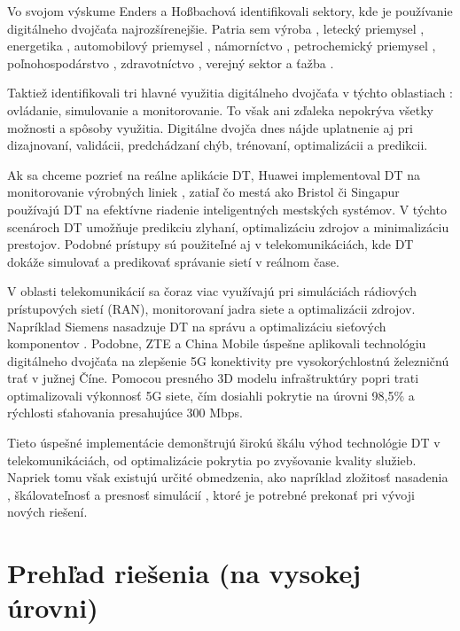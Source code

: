 \par{Vo  svojom výskume Enders a Hoßbachová \cite{DimensionOfDTAplication} identifikovali sektory, kde je používanie digitálneho dvojčaťa najrozšírenejšie. Patria sem výroba \cite{manuf}, letecký priemysel \cite{aircraft}, energetika \cite{energy}, automobilový priemysel \cite{automotive}, námorníctvo \cite{marine}, petrochemický priemysel \cite{oil}, poľnohospodárstvo \cite{agriculture}, zdravotníctvo \cite{health}, verejný sektor \cite{education} a ťažba \cite{mining}.
}
\par{Taktiež identifikovali tri hlavné využitia digitálneho dvojčaťa v týchto oblastiach \cite{AplicationsOfDT}: ovládanie, simulovanie a monitorovanie. To však ani zďaleka nepokrýva všetky možnosti a spôsoby využitia. Digitálne dvojča dnes nájde uplatnenie aj pri dizajnovaní, validácii, predchádzaní chýb, trénovaní, optimalizácii a predikcii.
}
\par{Ak sa chceme pozrieť na reálne aplikácie DT, Huawei implementoval DT na monitorovanie výrobných liniek \cite{huawei2020}, zatiaľ čo mestá ako Bristol \cite{Bristol} či Singapur \cite{singapur} používajú DT na efektívne riadenie inteligentných mestských systémov. V týchto scenároch DT umožňuje predikciu zlyhaní, optimalizáciu zdrojov a minimalizáciu prestojov. Podobné prístupy sú použiteľné aj v telekomunikáciách, kde DT dokáže simulovať a predikovať správanie sietí v reálnom čase. 
}
\par{V oblasti telekomunikácií sa čoraz viac využívajú pri simuláciách rádiových prístupových sietí (RAN), monitorovaní jadra siete a optimalizácii zdrojov. Napríklad Siemens nasadzuje DT na správu a optimalizáciu sieťových komponentov \cite{5g&beyond}. Podobne, ZTE a China Mobile \cite{ChinaMobile} úspešne aplikovali technológiu digitálneho dvojčaťa na zlepšenie 5G konektivity pre vysokorýchlostnú železničnú trať v južnej Číne. Pomocou presného 3D modelu infraštruktúry popri trati optimalizovali výkonnosť 5G siete, čím dosiahli pokrytie na úrovni 98,5\% a rýchlosti sťahovania presahujúce 300 Mbps. 
}
\par{ Tieto úspešné implementácie demonštrujú širokú škálu výhod technológie DT v telekomunikáciách, od optimalizácie pokrytia po zvyšovanie kvality služieb. Napriek tomu však existujú určité obmedzenia, ako napríklad zložitosť nasadenia \cite{impl}, škálovateľnosť \cite{econ} a presnosť simulácií \cite{predictions_risks}, ktoré je potrebné prekonať pri vývoji nových riešení. 
}

\section{Prehľad riešenia (na vysokej úrovni)}

